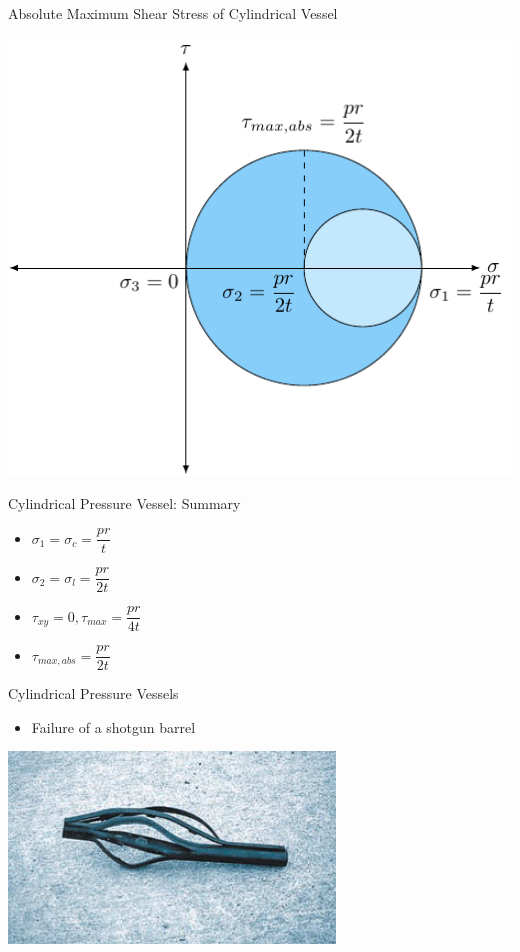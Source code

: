 \documentclass[10pt, svgnames]{beamer}
\begin{document}
\begin{frame}[label={sec:org0ece18f}]{Absolute Maximum Shear Stress of Cylindrical Vessel}
\begin{center}
\includegraphics[width=.9\linewidth]{pictures/abs-max-shear-cyl-vessel.pdf}
\end{center}
\end{frame}

\begin{frame}[label={sec:org224c6a4}]{Cylindrical Pressure Vessel: Summary}
\begin{itemize}
\item \(\sigma_1 = \sigma_c = \dfrac{pr}{t}\)
\item \(\sigma_2 = \sigma_l = \dfrac{pr}{2t}\)
\item \(\tau_{xy} = 0, \tau_{max} = \dfrac{pr}{4t}\)
\item \(\tau_{max,abs} = \dfrac{pr}{2t}\)
\end{itemize}
\end{frame}

\begin{frame}[label={sec:org7dce9b3}]{Cylindrical Pressure Vessels}
\begin{itemize}
\item Failure of a shotgun barrel
\end{itemize}

\begin{center}
\includegraphics[width=.9\linewidth]{./pictures/shotgun-barrel.png}
\end{center}
\end{frame}
\end{document}
